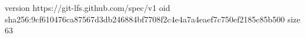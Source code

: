 version https://git-lfs.github.com/spec/v1
oid sha256:9cf610476ca87567d3db246884bf7708f2c4e4a7a4eaef7c750ef2185c85b500
size 63
